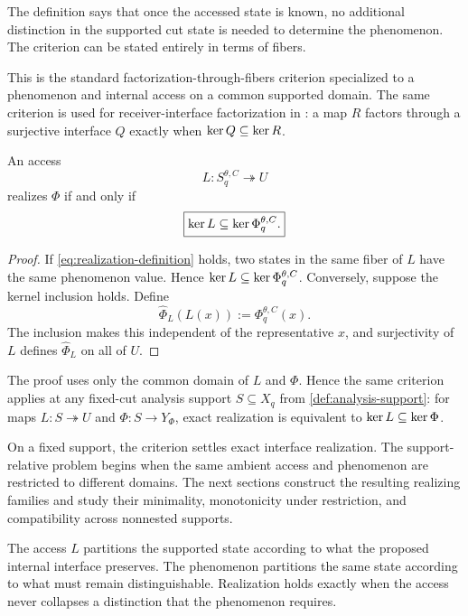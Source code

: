 The definition says that once the accessed state is known, no additional distinction in the supported cut state is needed to determine the phenomenon. The criterion can be stated entirely in terms of fibers.

This is the standard factorization-through-fibers criterion specialized to a phenomenon and internal access on a common supported domain. The same criterion is used for receiver-interface factorization in \citet{rosariofreytes2026architecture}: a map $R$ factors through a surjective interface $Q$ exactly when $\operatorname{ker} Q\subseteq\operatorname{ker} R$.

\begin{theorem}
\label{thm:realization-criterion}
An access
\[
L:S_q^{\theta,C}\twoheadrightarrow U
\]
realizes $\Phi$ if and only if
\begin{equation}
\boxed{
\operatorname{ker} L
\subseteq
\operatorname{ker}\Phi_q^{\theta,C}.
}
\label{eq:realization-kernel}
\end{equation}
\end{theorem}

\begin{proof}
If \eqref{eq:realization-definition} holds, two states in the same fiber of $L$ have the same phenomenon value. Hence $\operatorname{ker} L\subseteq\operatorname{ker}\Phi_q^{\theta,C}$. Conversely, suppose the kernel inclusion holds. Define
\[
\widehat\Phi_L(L(x)):=\Phi_q^{\theta,C}(x).
\]
The inclusion makes this independent of the representative $x$, and surjectivity of $L$ defines $\widehat\Phi_L$ on all of $U$.
\end{proof}

The proof uses only the common domain of $L$ and $\Phi$. Hence the same criterion applies at any fixed-cut analysis support $S\subseteq X_q$ from \cref{def:analysis-support}: for maps $L:S\twoheadrightarrow U$ and $\Phi:S\to Y_\Phi$, exact realization is equivalent to $\operatorname{ker} L\subseteq\operatorname{ker}\Phi$.

On a fixed support, the criterion settles exact interface realization. The support-relative problem begins when the same ambient access and phenomenon are restricted to different domains. The next sections construct the resulting realizing families and study their minimality, monotonicity under restriction, and compatibility across nonnested supports.

The access $L$ partitions the supported state according to what the proposed internal interface preserves. The phenomenon partitions the same state according to what must remain distinguishable. Realization holds exactly when the access never collapses a distinction that the phenomenon requires.

